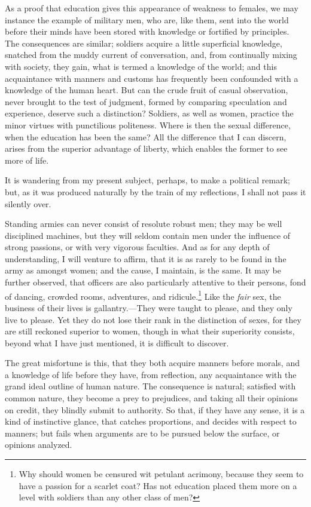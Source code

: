 As a proof that education gives this appearance of weakness to
females, we may instance the example of military men, who are, like
them, sent into the world before their minds have been stored with
knowledge or fortified by principles. The consequences are similar;
soldiers acquire a little superficial knowledge, snatched from the
muddy current of conversation, and, from continually mixing with
society, they gain, what is termed a knowledge of the world; and this
acquaintance with manners and customs has frequently been confounded
with a knowledge of the human heart. But can the crude fruit of casual
observation, never brought to the test of judgment, formed by
comparing speculation and experience, deserve such a distinction?
Soldiers, as well as women, practice the minor virtues with
punctilious politeness. Where is then the sexual difference, when the
education has been the same? All the difference that I can discern,
arises from the superior advantage of liberty, which enables the
former to see more of life.

It is wandering from my present subject,  perhaps, to make a
political remark; but, as it was produced naturally by the train of my
reflections, I shall not pass it silently over.

Standing armies can never consist of resolute robust men; they may be
well disciplined machines, but they will seldom contain men under the
influence of strong passions, or with very vigorous faculties. And as
for any depth of understanding, I will venture to affirm, that it is
as rarely to be found in the army as amongst women; and the cause, I
maintain, is the same. It may be further observed, that officers are
also particularly attentive to their persons, fond of dancing, crowded
rooms, adventures, and ridicule.\footnote{Why should women be censured
wit petulant acrimony, because they seem to have a passion for a
scarlet coat? Has not education placed them more on a level with
soldiers than any other class of men?} Like the \textit{fair} sex, the
business of their lives is gallantry.---They were taught to please,
and they only live to please. Yet they do not lose their rank in the
distinction of sexes, for they are still reckoned superior to women,
though in what their superiority consists, beyond what I have just
mentioned, it is difficult to discover.

The great misfortune is this, that they  both acquire manners
before morals, and a knowledge of life before they have, from
reflection, any acquaintance with the grand ideal outline of human
nature. The consequence is natural; satisfied with common nature, they
become a prey to prejudices, and taking all their opinions on credit,
they blindly submit to authority. So that, if they have any sense, it
is a kind of instinctive glance, that catches proportions, and decides
with respect to manners; but fails when arguments are to be pursued
below the surface, or opinions analyzed.

